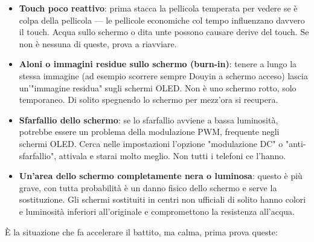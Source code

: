 
\begin{itemize}
  \item \textbf{Touch poco reattivo}: prima stacca la pellicola temperata per vedere se è colpa della pellicola — le pellicole economiche col tempo influenzano davvero il touch. Acqua sullo schermo o dita unte possono causare derive del touch. Se non è nessuna di queste, prova a riavviare.
  \item \textbf{Aloni o immagini residue sullo schermo (burn-in)}: tenere a lungo la stessa immagine (ad esempio scorrere sempre Douyin a schermo acceso) lascia un'"immagine residua" sugli schermi OLED. Non è uno schermo rotto, solo temporaneo. Di solito spegnendo lo schermo per mezz'ora si recupera.
  \item \textbf{Sfarfallio dello schermo}: se lo sfarfallio avviene a bassa luminosità, potrebbe essere un problema della modulazione PWM, frequente negli schermi OLED. Cerca nelle impostazioni l'opzione "modulazione DC" o "anti-sfarfallio", attivala e starai molto meglio. Non tutti i telefoni ce l'hanno.
  \item \textbf{Un'area dello schermo completamente nera o luminosa}: questo è più grave, con tutta probabilità è un danno fisico dello schermo e serve la sostituzione. Gli schermi sostituiti in centri non ufficiali di solito hanno colori e luminosità inferiori all'originale e compromettono la resistenza all'acqua.
\end{itemize}


È la situazione che fa accelerare il battito, ma calma, prima prova queste:

